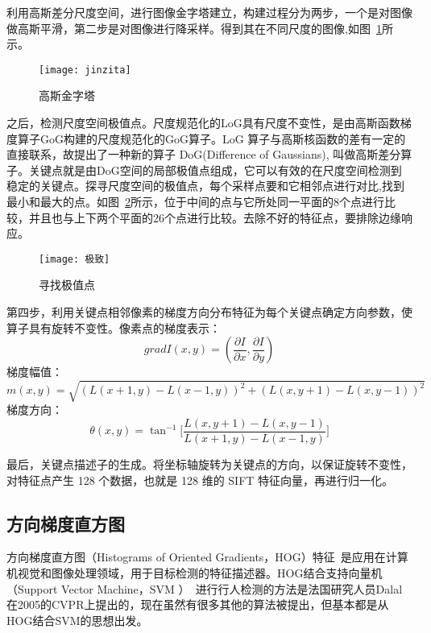利用高斯差分尺度空间，进行图像金字塔建立，构建过程分为两步，一个是对图像做高斯平滑，第二步是对图像进行降采样。得到其在不同尺度的图像,如图~\ref{fig:jinzita}所示。
\begin{figure}[H] %
  \centering
  \texttt{[image: jinzita]}
  \caption{高斯金字塔}
  \label{fig:jinzita}
\end{figure}
之后，检测尺度空间极值点。尺度规范化的LoG具有尺度不变性，是由高斯函数梯度算子GoG构建的尺度规范化的GoG算子。LoG 算子与高斯核函数的差有一定的直接联系，故提出了一种新的算子 DoG(Difference of Gaussians), 叫做高斯差分算子。关键点就是由DoG空间的局部极值点组成，它可以有效的在尺度空间检测到稳定的关键点。探寻尺度空间的极值点，每个采样点要和它相邻点进行对比,找到最小和最大的点。如图~\ref{fig:jizhidian}所示，位于中间的点与它所处同一平面的8个点进行比较，并且也与上下两个平面的26个点进行比较。去除不好的特征点，要排除边缘响应。
\begin{figure}[H] %
  \centering
  \texttt{[image: 极致]}
  \caption{寻找极值点}
  \label{fig:jizhidian}
\end{figure}
第四步，利用关键点相邻像素的梯度方向分布特征为每个关键点确定方向参数，使算子具有旋转不变性。像素点的梯度表示：
\begin{equation}
 gradI(x,y) = (\frac{\partial I}{\partial x},\frac{\partial I}{\partial y})
\end{equation}
梯度幅值：
\begin{equation}
 m(x,y) = \sqrt{(L(x+1,y)-L(x-1,y))^{2}+(L(x,y+1)-L(x,y-1))^{2}}
\end{equation}
梯度方向：
\begin{equation}
 \theta (x,y)  =  \tan^{-1}\Big[\frac{L(x,y+1)-L(x,y-1)}{L(x+1,y)-L(x-1,y)}\Big]
\end{equation}

最后，关键点描述子的生成。将坐标轴旋转为关键点的方向，以保证旋转不变性，对特征点产生 128 个数据，也就是 128 维的 SIFT 特征向量，再进行归一化。 

\subsection{方向梯度直方图}
\label{sec:hog}
方向梯度直方图（Histograms of Oriented Gradients，HOG）特征~\cite{dalal2005histograms}是应用在计算机视觉和图像处理领域，用于目标检测的特征描述器。HOG结合支持向量机（Support Vector Machine，SVM ）~\cite{cortes1995support}进行行人检测的方法是法国研究人员Dalal在2005的CVPR上提出的，现在虽然有很多其他的算法被提出，但基本都是从HOG结合SVM的思想出发。

